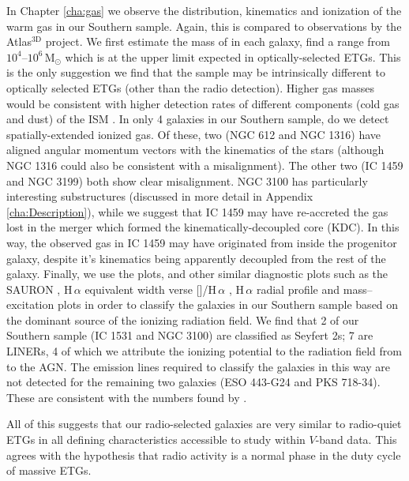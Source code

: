 In Chapter \ref{cha:gas} we observe the distribution, kinematics and ionization of the warm gas in our Southern sample. Again, this is compared to observations by the Atlas$^\text{3D}$ project. We first estimate the mass of  in each galaxy, find a range from $10^4$--$10^6\,\mathrm{M_\odot}$ which is at the upper limit expected in optically-selected ETGs. This is the only suggestion we find that the sample may be intrinsically different to optically selected ETGs (other than the radio detection). Higher gas masses would be consistent with higher detection rates of different components (cold gas and dust) of the ISM \citep[e.g.][]{deRuiter2002, Leon2003, VerdoesKleijn2005}. In only 4 galaxies in our Southern sample, do we detect spatially-extended ionized gas. Of these, two (NGC 612 and NGC 1316) have aligned angular momentum vectors with the kinematics of the stars (although NGC 1316 could also be consistent with a misalignment). The other two (IC 1459 and NGC 3199) both show clear misalignment. NGC 3100 has particularly interesting substructures (discussed in more detail in Appendix \ref{cha:Description}), while we suggest that IC 1459 may have re-accreted the gas lost in the merger which formed the kinematically-decoupled core (KDC). In this way, the observed gas in IC 1459 may have originated from inside the progenitor galaxy, despite it's kinematics being apparently decoupled from the rest of the galaxy. Finally, we use the \citet[; BPT]{Baldwin1981} plots, and other similar diagnostic plots such as the SAURON \citep{Sarzi2010}, H\,$\alpha$ equivalent width verse []/H\,$\alpha$ \citep[WHaN2;][]{CidFernandes2011}, H\,$\alpha$ radial profile and mass--excitation \citep[MEx;][]{Nyland2016} plots in order to classify the galaxies in our Southern sample based on the dominant source of the ionizing radiation field. We find that 2 of our Southern sample (IC 1531 and NGC 3100) are classified as Seyfert 2s; 7 are LINERs, 4 of which we attribute the ionizing potential to the radiation field from to the AGN. The emission lines required to classify the galaxies in this way are not detected for the remaining two galaxies (ESO 443-G24 and PKS 718-34). These are consistent with the numbers found by \citet{Nyland2016}.

All of this suggests that our radio-selected galaxies are very similar to radio-quiet ETGs in all defining characteristics accessible to study within $V$-band data. This agrees with the hypothesis that radio activity is a normal phase in the duty cycle of massive ETGs. 

